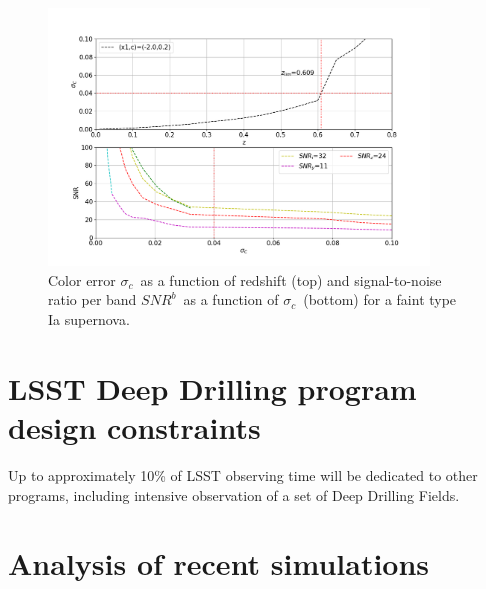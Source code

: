 \documentclass[\docopts]{\docclass}
\newcommand{\snrb}{\mbox{$SNR^b$}}
\newcommand{\sigc}{\mbox{$\sigma_c$}}
\begin{document}
\begin{figure}[htbp]
\begin{center}
  \includegraphics[width=0.9\textwidth]{sigmaC_z.png}
 \caption{Color error \sigc~as a function of redshift (top) and signal-to-noise ratio per band \snrb~as a function of \sigc~(bottom) for a faint type Ia supernova.}\label{fig:sigc_z}
\end{center}
\end{figure}


\section{LSST Deep Drilling program design constraints}
\label{sec:designb}

Up to approximately 10\% of LSST observing time will be dedicated to other programs, including intensive observation of a set of Deep Drilling Fields. 



\section{Analysis of recent simulations}










\end{document}
